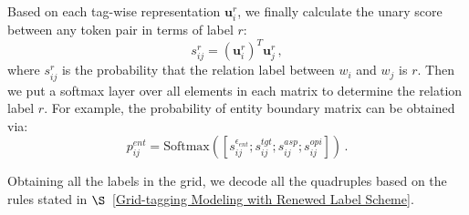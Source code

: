 \documentclass[11pt]{article}
\begin{document}
Based on each tag-wise representation $\bm{u}^r_i$, we finally calculate the unary score between any token pair in terms of label $r$:
\begin{equation}
  s^r_{ij} = (\bm{u}^r_i)^T \bm{u}^r_j  \,,
  \label{eq_biaffine}
\end{equation}
where $s^r_{ij}$ is the probability that the relation label between $w_i$ and $w_j$ is $r$.
Then we put a softmax layer over all elements in each matrix to determine the relation label $r$.
For example, the probability of entity boundary matrix can be obtained via:
\begin{equation}
\label{eq-3} p^{ent}_{ij} = \text{Softmax}([s^{\epsilon_{ent}}_{ij}; s^{tgt}_{ij}; s^{asp}_{ij}; s^{opi}_{ij}]) \,.
\end{equation}

Obtaining all the labels in the grid, we decode all the quadruples based on the rules stated in $\S$~\ref{Grid-tagging Modeling with Renewed Label Scheme}.
  
\end{document}
